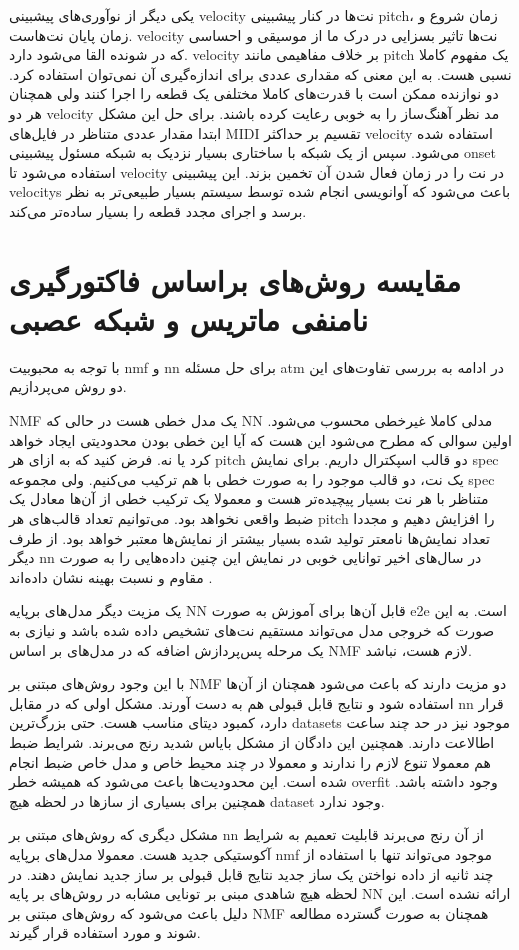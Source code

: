 یکی دیگر از نوآوری‌های \cite{hawthorne2017onsets} پیشبینی \gls{velocity} نت‌ها
در کنار پیشبینی \gls{pitch}، زمان شروع و زمان پایان نت‌هاست. \gls{velocity}
نت‌ها تاثیر بسزایی در درک ما از موسیقی و احساسی که در شونده القا می‌شود دارد.
\gls{velocity} بر خلاف مفاهیمی مانند \gls{pitch} یک مفهوم کاملا نسبی هست. به این
معنی که مقداری عددی برای اندازه‌گیری آن نمی‌توان استفاده کرد. دو نوازنده ممکن
است با قدرت‌های کاملا مختلفی یک قطعه را اجرا کنند ولی همچنان هر دو
\gls{velocity} مد نظر آهنگ‌ساز را به خوبی رعایت کرده باشند. برای حل این مشکل
ابتدا مقدار عددی متناظر در فایل‌های \gls{MIDI} تقسیم بر حداکثر \gls{velocity}
استفاده شده می‌شود. سپس از یک شبکه با ساختاری بسیار نزدیک به شبکه مسئول پیشبینی
onset استفاده می‌شود تا \gls{velocity} در نت را در زمان فعال شدن آن تخمین بزند.
این پیشبینی \glspl{velocity} باعث می‌شود که آوانویسی انجام شده توسط سیستم بسیار
طبیعی‌تر به نظر برسد و اجرای مجدد قطعه را بسیار ساده‌تر می‌کند.

\section{مقایسه روش‌های براساس فاکتورگیری نامنفی ماتریس و شبکه عصبی}
با توجه به محبوبیت \gls{nmf} و \gls{nn} برای حل مسئله \gls{atm} در ادامه به
بررسی تفاوت‌های این دو روش می‌پردازیم.

\gls{NMF} یک مدل خطی هست در حالی که \gls{NN} مدلی کاملا غیرخطی محسوب می‌شود.
اولین سوالی که مطرح می‌شود این هست که آیا این خطی بودن محدودیتی ایجاد خواهد کرد
یا نه. فرض کنید که به ازای هر \gls{pitch} دو قالب اسپکترال داریم. برای نمایش
\gls{spec} یک نت، دو قالب موجود را به صورت خطی با هم ترکیب می‌کنیم. ولی مجموعه
\gls{spec} متناظر با هر نت بسیار پیچیده‌تر هست و معمولا یک ترکیب خطی از آن‌ها
معادل یک ضبط واقعی نخواهد بود. می‌توانیم تعداد قالب‌های هر \gls{pitch} را افزایش
دهیم و مجددا تعداد نمایش‌ها نامعتر تولید شده بسیار بیشتر از نمایش‌ها معتبر خواهد
بود. از طرف دیگر \gls{nn} در سال‌های اخیر توانایی خوبی در نمایش این چنین
داده‌هایی را به صورت مقاوم و نسبت بهینه نشان داده‌اند \cite{goodfellow2016deep}.

یک مزیت دیگر مدل‌های برپایه \gls{NN} قابل آن‌ها برای آموزش به صورت \gls{e2e}
است. به این صورت که خروجی مدل می‌تواند مستقیم نت‌های تشخیص داده شده باشد و نیازی
به یک مرحله پس‌پردازش اضافه که در مدل‌های بر اساس \gls{NMF} لازم هست، نباشد.

با این وجود روش‌های مبتنی بر \gls{NMF} دو مزیت دارند که باعث می‌شود همچنان از
آن‌ها استفاده شود و نتایج قابل قبولی هم به دست آورند. مشکل اولی که در مقابل
\gls{nn} قرار دارد، کمبود دیتای مناسب هست. حتی بزرگ‌ترین \glspl{dataset} موجود
نیز در حد چند ساعت اطالاعت دارند. همچنین این دادگان از مشکل بایاس شدید رنج
می‌برند. شرایط ضبط هم معمولا تنوع لازم را ندارند و معمولا در چند محیط خاص و مدل
خاص ضبط انجام شده است. این محدودیت‌ها باعث می‌شود که همیشه خطر \gls{overfit}
وجود داشته باشد. همچنین برای بسیاری از سازها در لحظه هیچ \gls{dataset} وجود
ندارد.

مشکل دیگری که روش‌های مبتنی بر \gls{nn} از آن رنج می‌برند قابلیت تعمیم به شرایط
آکوستیکی جدید هست. معمولا مدل‌های برپایه \gls{nmf} موجود می‌تواند تنها با
استفاده از چند ثانیه از داده نواختن یک ساز جدید نتایج قابل قبولی بر ساز جدید
نمایش دهند. در لحظه هیچ شاهدی مبنی بر تونایی مشابه در روش‌های بر پایه \gls{NN}
ارائه نشده است. این دلیل باعث می‌شود که روش‌های مبتنی بر \gls{NMF} همچنان به
صورت گسترده مطالعه شوند و مورد استفاده قرار گیرند.